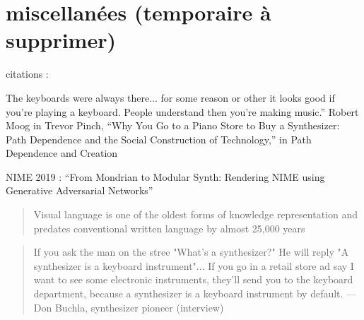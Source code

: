 \section*{miscellanées (temporaire à supprimer)}
citations :

The  keyboards  were  always  there...  for  some  reason  or  other  it  looks  good  if  you’re playing a keyboard. People understand then you’re making music.” Robert Moog in Trevor Pinch, “Why You Go to a Piano Store to Buy a Synthesizer: Path Dependence and the Social Construction of Technology,” in Path Dependence and Creation


NIME 2019 : ``From Mondrian to Modular Synth: Rendering NIME using Generative Adversarial Networks''

\begin{quote}
Visual language is one of the oldest forms of knowledge representation and predates conventional written language by almost 25,000 years
\end{quote}
\cite{tufte_visual_2001}

\cite{moody_physics_2009}


\begin{quotation}
If you ask the man on the stree "What's a synthesizer?" He will reply "A synthesizer is a keyboard instrument"... If you go in a retail store ad say I want to see some electronic instruments, they'll send you to the keyboard department, because a synthesizer is a keyboard instrument by default. — Don Buchla, synthesizer pioneer (interview)
\end{quotation}
\cite{pinch_why_2001}